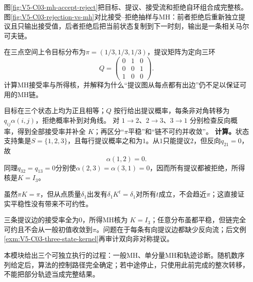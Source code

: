 \label{struct:V5-C03-CH17}
图\ref{fig:V5-C03-mh-accept-reject}把目标、提议、接受流和拒绝自环组合成完整核。图\ref{fig:V5-C03-rejection-vs-mh}对比接受--拒绝抽样与MH：前者拒绝后重新独立提议且只输出接受值，后者拒绝后把当前状态复制到下一时刻，输出是一条相关马尔可夫链。


\label{struct:V5-C03-CH18}
\begin{example}[单向提议造成的支持连通缺口]\label{exm:V5-C03-asymmetric-proposal}
在三点空间上令目标分布为$\pi=(1/3,1/3,1/3)$，提议矩阵为定向三环
\[
Q=\begin{pmatrix}
0&1&0\\
0&0&1\\
1&0&0
\end{pmatrix}.
\]
计算MH接受率与所得核，并解释为什么“提议图从每点都有出边”仍不足以保证可用的MH链。
\end{example}

\begin{solution}
\SolGiven 目标在三个状态上均为正且相等；$Q$ 按行给出提议概率，每条非对角转移为 $q_{ij}\alpha(i,j)$，拒绝概率补到对角线。
\SolPlan 对 $1\to2$、$2\to3$、$3\to1$ 分别检查反向概率，得到全部接受率并补全 $K$；再区分“$\pi$平稳”和“链不可约并收敛”。
\SolDerive
\textbf{计算。}状态支持集是$S=\{1,2,3\}$，且每行提议概率之和为$1$。从$1$只能提议$2$，但反向$q_{21}=0$，故
\[
\alpha(1,2)=0.
\]
同理$q_{32}=q_{13}=0$分别使$\alpha(2,3)=\alpha(3,1)=0$，因而所有提议都被拒绝，所得核是$K=I_3$。

\SolCheck 虽然$\pi K=\pi$，但从点质量$\delta_1$出发有$\delta_1K^t=\delta_1$对所有$t$成立，不会趋近$\pi$；这直接证实平稳性没有带来不可约性。

\SolAnswer 三条提议边的接受率全为$0$，所得MH核为 $K=I_3$；任意分布虽都平稳，但链完全可约且不会从一般初值收敛到$\pi$。问题在于每条有向提议边都缺少反向流；后文例\ref{exm:V5-C03-three-state-kernel}再审计双向非对称提议。
\end{solution}

\label{struct:V5-C03-CH19}
本模块给出三个可独立执行的过程：一般MH、单分量MH和轨迹诊断。随机数序列给定后，算法的控制路径完全确定；若中途停止，只使用此前完成的整次转移，不能把部分轨迹当成完整结果。


